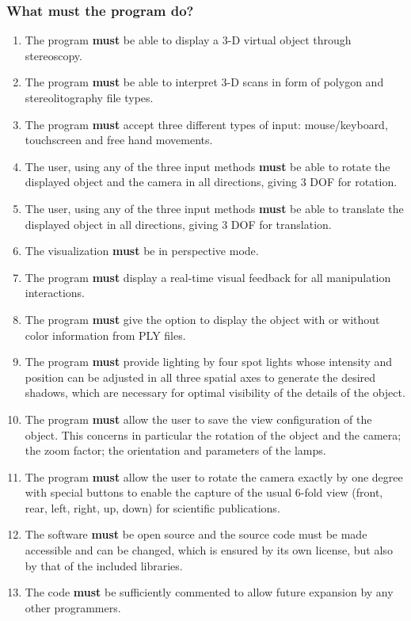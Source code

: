 \documentclass[12pt]{extarticle}
\begin{document}
\subsubsection{What must the program do?}
\begin{enumerate}
\item
The program \textbf{must} be able to display a 3-D virtual object through stereoscopy.
\item
The program \textbf{must} be able to interpret 3-D scans in form of polygon and stereolitography file types.
\item
The program \textbf{must} accept three different types of input: mouse/keyboard, touchscreen and free hand movements.
\item
The user, using any of the three input methods \textbf{must} be able to rotate the displayed object and the camera in all directions, giving 3 DOF for rotation.
\item
The user, using any of the three input methods \textbf{must} be able to translate the displayed object in all directions, giving 3 DOF for translation.
\item
The visualization \textbf{must} be in perspective mode.
\item
The program \textbf{must} display a real-time visual feedback for all manipulation interactions.
\item
The program \textbf{must} give the option to display the object with or without color information from PLY files.
\item
The program \textbf{must} provide lighting by four spot lights whose intensity and position can be adjusted in all three spatial axes to generate the desired shadows, which are necessary for optimal visibility of the details of the object.
\item
The program \textbf{must} allow the user to save the view configuration of the object. This concerns in particular the rotation of the object and the camera; the zoom factor; the orientation and parameters of the lamps.
\item
The program \textbf{must} allow the user to rotate the camera exactly by one degree with special buttons to enable the capture of the usual 6-fold view (front, rear, left, right, up, down) for scientific publications.
\item
The software \textbf{must} be open source and the source code must be made accessible and can be changed, which is ensured by its own license, but also by that of the included libraries.
\item
The code \textbf{must} be sufficiently commented to allow future expansion by any other programmers.
\end{enumerate}
\end{document}
